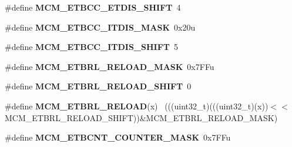 \begin{DoxyCompactItemize}
\item 
\hypertarget{group___m_c_m___register___masks_ga40fefdc2fb703f686abf76fda0ec6859}{}\#define {\bfseries M\+C\+M\+\_\+\+E\+T\+B\+C\+C\+\_\+\+E\+T\+D\+I\+S\+\_\+\+S\+H\+I\+F\+T}~4\label{group___m_c_m___register___masks_ga40fefdc2fb703f686abf76fda0ec6859}

\item 
\hypertarget{group___m_c_m___register___masks_ga390a11a02383ea3369843438b3a5ff80}{}\#define {\bfseries M\+C\+M\+\_\+\+E\+T\+B\+C\+C\+\_\+\+I\+T\+D\+I\+S\+\_\+\+M\+A\+S\+K}~0x20u\label{group___m_c_m___register___masks_ga390a11a02383ea3369843438b3a5ff80}

\item 
\hypertarget{group___m_c_m___register___masks_ga92bf57df9f719917686203be01c3d141}{}\#define {\bfseries M\+C\+M\+\_\+\+E\+T\+B\+C\+C\+\_\+\+I\+T\+D\+I\+S\+\_\+\+S\+H\+I\+F\+T}~5\label{group___m_c_m___register___masks_ga92bf57df9f719917686203be01c3d141}

\item 
\hypertarget{group___m_c_m___register___masks_gab63bbd758727921d1744034311a25c81}{}\#define {\bfseries M\+C\+M\+\_\+\+E\+T\+B\+R\+L\+\_\+\+R\+E\+L\+O\+A\+D\+\_\+\+M\+A\+S\+K}~0x7\+F\+Fu\label{group___m_c_m___register___masks_gab63bbd758727921d1744034311a25c81}

\item 
\hypertarget{group___m_c_m___register___masks_ga04c87446d72a2644f3ee4d493f5febba}{}\#define {\bfseries M\+C\+M\+\_\+\+E\+T\+B\+R\+L\+\_\+\+R\+E\+L\+O\+A\+D\+\_\+\+S\+H\+I\+F\+T}~0\label{group___m_c_m___register___masks_ga04c87446d72a2644f3ee4d493f5febba}

\item 
\hypertarget{group___m_c_m___register___masks_ga53a4722fc980bec9ee5eef81c820c33b}{}\#define {\bfseries M\+C\+M\+\_\+\+E\+T\+B\+R\+L\+\_\+\+R\+E\+L\+O\+A\+D}(x)                                        ~(((uint32\+\_\+t)(((uint32\+\_\+t)(x))$<$$<$M\+C\+M\+\_\+\+E\+T\+B\+R\+L\+\_\+\+R\+E\+L\+O\+A\+D\+\_\+\+S\+H\+I\+F\+T))\&M\+C\+M\+\_\+\+E\+T\+B\+R\+L\+\_\+\+R\+E\+L\+O\+A\+D\+\_\+\+M\+A\+S\+K)\label{group___m_c_m___register___masks_ga53a4722fc980bec9ee5eef81c820c33b}

\item 
\hypertarget{group___m_c_m___register___masks_ga0ad096c8133f83aad1812ed0263a47a7}{}\#define {\bfseries M\+C\+M\+\_\+\+E\+T\+B\+C\+N\+T\+\_\+\+C\+O\+U\+N\+T\+E\+R\+\_\+\+M\+A\+S\+K}~0x7\+F\+Fu\label{group___m_c_m___register___masks_ga0ad096c8133f83aad1812ed0263a47a7}


\end{DoxyCompactItemize}
